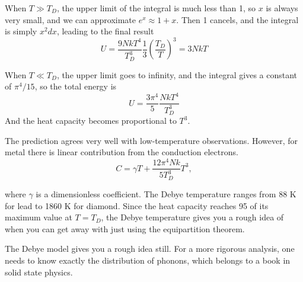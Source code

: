 When $T \gg T_D$, the upper limit of the integral is much less than 1, so $x$ is always very small, and we 
can approximate $e^x \approx 1+x$. Then 1 cancels, and the integral is simply $x^2dx$, leading to the final result
\begin{equation}
 U = \frac{9NkT^4}{T_D^3} \frac{1}{3} (\frac{T_D}{T})^3 = 3NkT
\end{equation}

When $T \ll T_D$, the upper limit goes to infinity, and the integral gives a constant of $\pi^4/15$, so the total energy is
\begin{equation}
U = \frac{3\pi^4}{5} \frac{NkT^4}{T_D^3}
\end{equation}
And the heat capacity becomes proportional to $T^3$.

The prediction agrees very well with low-temperature observations. However, for metal there is linear contribution from the conduction electrons.
\begin{equation}
C = \gamma T + \frac{12\pi^4Nk}{5T_D^3} T^3,
\end{equation}

where $\gamma$ is a dimensionless coefficient. The Debye temperature ranges from 88 K for lead to 1860 K for diamond. Since the heat capacity reaches 95 of its maximum value at $T=T_D$, the Debye
temperature gives you a rough idea of when you can get away with just using the equipartition theorem. 

The Debye model gives you a rough idea still. For a more rigorous analysis, one needs to know exactly the distribution of phonons, which belongs
to a book in solid state physics.

